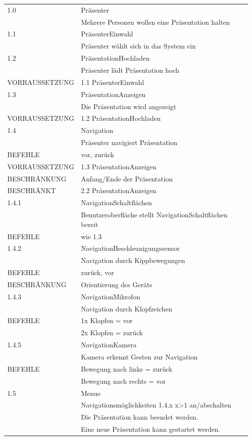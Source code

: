 \begin{tabularx}{\textwidth}[!htb]{|l|X|}
	\hline
	1.0 & Präsenter \\
	 & Mehrere Personen wollen eine Präsentation halten \\
	\hline
	\hline
	1.1 & PräsenterEinwahl\\
	& Präsenter wählt sich in das System ein\\
	\hline
	\hline
	1.2 & PräsentationHochladen\\
	& Präsenter lädt Präsentation hoch\\
	VORRAUSSETZUNG & 1.1 PräsenterEinwahl\\
	\hline
	\hline
	1.3 & PräsentationAnzeigen\\
	& Die Präsentation wird angezeigt\\
	VORRAUSSETZUNG & 1.2 PräsentationHochladen\\
	\hline
	\hline
	1.4 & Navigation\\
	& Präsenter navigiert Präsentation\\
	BEFEHLE & vor, zurück\\
	VORRAUSSETZUNG & 1.3 PräsentationAnzeigen\\
	BESCHRÄNKUNG & Anfang/Ende der Präsentation\\
	BESCHRÄNKT & 2.2 PräsentationAnzeigen\\
	\hline
	\hline
	1.4.1 & NavigationSchaltflächen\\
	& Benutzeroberfläche stellt NavigationSchaltflächen bereit\\
	BEFEHLE & wie 1.3\\
	\hline
	\hline
	1.4.2 & NavigationBeschleunigungssensor\\
	& Navigation durch Kippbewegungen\\
	BEFEHLE & zurück, vor\\
	BESCHRÄNKUNG & Orientierung des Geräts\\
	\hline
	\hline
	1.4.3 & NavigationMikrofon\\
	& Navigation durch Klopfzeichen\\
	BEFEHLE & 1x Klopfen = vor\\
	& 2x Klopfen = zurück\\
	\hline
	\hline
	1.4.5 & NavigationKamera\\
	& Kamera erkennt Gesten zur Navigation\\
	BEFEHLE & Bewegung nach links = zurück\\
	& Bewegung nach rechts = vor\\
	\hline
	\hline
	1.5 & Menue\\
	& Navigationsmöglichkeiten 1.4.x x>1 an/abschalten\\
	& Die Präsentation kann beendet werden.\\
	& Eine neue Präsentation kann gestartet werden.\\
	\hline
\end{tabularx}

